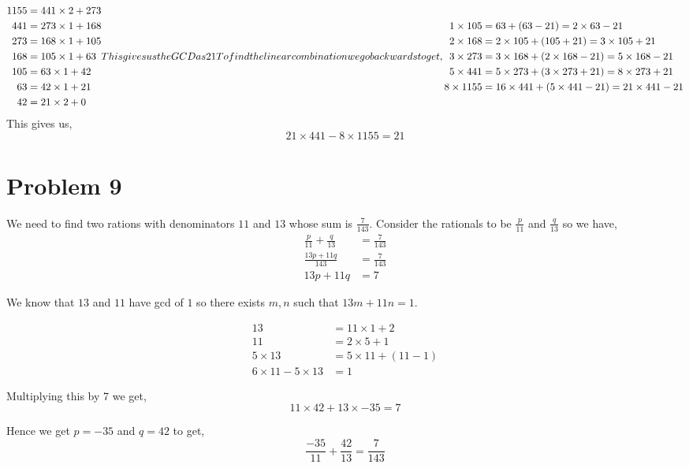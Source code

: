 \documentclass[a4paper]{report}
\begin{document}
 
\begin{align*}
    1155 &= 441 \times 2 +  273\\
    441 &= 273 \times 1 + 168\\
    273 &= 168 \times 1 + 105\\
    168 &= 105 \times 1 + 63\\
    105 &= 63 \times 1 + 42\\
    63 &= 42 \times 1 + 21\\
    42 &= 21 \times2 + 0
\end{align}
This gives us the GCD as $21$

To find the linear combination we go backwards to get,
\begin{align*}
    1 \times 105 &= 63 + (63 - 21)= 2\times63 - 21\\
    2 \times 168 &= 2 \times 105 + (105 + 21) = 3 \times 105 + 21\\
    3 \times 273 &= 3 \times 168 + (2 \times 168 - 21) = 5 \times 168 - 21\\
    5 \times 441 &= 5 \times 273  + (3 \times 273 + 21) = 8 \times 273 + 21\\
    8 \times 1155 &= 16 \times 441 + (5 \times 441 - 21) = 21 \times 441 - 21\\
\end{align*}
This gives us, 
    $$21\times 441 - 8 \times 1155 = 21$$




\section*{Problem 9}
We need to find two rations with denominators $11$ and  $13$ whose sum is  $\frac{7}{143}$. Consider the rationals to be $\frac{p}{11}$ and $\frac{q}{13}$ so we have, 
\begin{align*}
    \frac{p}{11} + \frac{q}{13} &= \frac{7}{143} \\
    \frac{13p + 11q      }{143} &= \frac{7}{143}\\
    13p + 11q &= 7
\end{align*}

We know that $13$ and  $11$ have gcd of  $1$ so there exists $m, n$ such that  $13m + 11n = 1$. 

 \begin{align*}
    13 &= 11 \times 1 + 2\\
    11 &= 2 \times 5 + 1\\
    5 \times 13 &= 5 \times 11  + (11 - 1)\\
    6 \times 11 -5 \times 13 &= 1
\end{align*}


Multiplying this by 7 we get, 
$$ 11 \times 42 + 13 \times -35= 7 $$ 


Hence we get $p = -35$ and $q = 42$ to get,  
$$ \frac{-35}{11} + \frac{42}{13} = \frac{7}{143} $$ 
\end{document}
